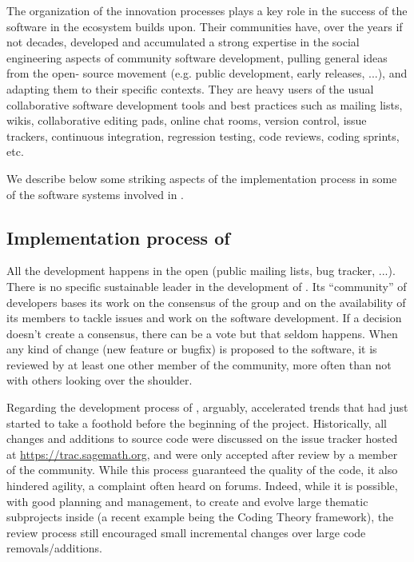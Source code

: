 \documentclass{deliverablereport}
\begin{document}
The organization of the innovation processes plays a key
role in the success of the software in the ecosystem \ODK builds upon.
Their
communities have, over the years if not decades, developed and
accumulated a strong expertise in the social engineering aspects of
community software development, pulling general ideas from the open-
source movement (e.g. public development, early releases, ...), and
adapting them to their specific contexts. They are heavy users of the
usual collaborative software development tools and best practices such
as mailing lists, wikis, collaborative editing pads, online chat
rooms, version control, issue trackers, continuous integration,
regression testing, code reviews, coding sprints, etc.

We describe below some striking aspects of the implementation process
in some of the software systems involved in \ODK.

\subsection{Implementation process of \Sage}

All the development happens in the open (public mailing lists, bug
tracker, ...). There is no specific sustainable leader in the
development of \Sage. Its ``community'' of developers bases its work on
the consensus of the group and on the availability of its members to
tackle issues and work on the software development. If a decision
doesn't create a consensus, there can be a vote but that seldom
happens. When any kind of change (new feature or bugfix)
is proposed to the software, it is reviewed
by at least one other member of the community, more often than not
with others looking over the shoulder.

Regarding the development process of \Sage, arguably, \ODK accelerated
trends that had just started to take a foothold before the beginning
of the project. %
Historically, all changes and additions to \Sage source code were
discussed on the issue tracker hosted at
\url{https://trac.sagemath.org}, and were only accepted after review
by a member of the community. %
While this process guaranteed the quality of the code, it also
hindered agility, a complaint often heard on \Sage forums. %
Indeed, while it is possible, with good planning and management, to
create and evolve large thematic subprojects inside \Sage (a recent
example being the Coding Theory framework), the review process still
encouraged small incremental changes over large code
removals/additions.
\end{document}
